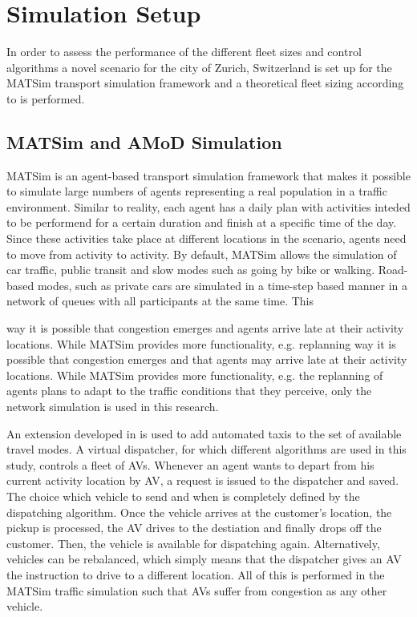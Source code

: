 \section{Simulation Setup}

In order to assess the performance of the different fleet sizes and control
algorithms a novel scenario for the city of Zurich, Switzerland is set up
for the MATSim transport simulation framework and a theoretical fleet sizing
according to \citep{spieser2014toward} is performed.


\subsection{MATSim and AMoD Simulation}

MATSim \citep{Horni2015} is an agent-based transport simulation framework that makes it possible
to simulate large numbers of agents representing a real population in a traffic environment. Similar to reality, each agent has a daily plan with activities
inteded to be performend for a certain duration and finish at a specific time of
the day. Since these activities take place at different locations in the scenario,
agents need to move from activity to activity. By default, MATSim allows the
simulation of car traffic, public transit and slow modes such as going by bike
or walking. Road-based modes, such as private cars are simulated in a time-step
based manner in a network of queues with all participants at the same time. This

way it is possible that congestion emerges and agents arrive late at their
activity locations. While MATSim provides more functionality, e.g. replanning
way it is possible that congestion emerges and that agents may arrive late at their
activity locations. While MATSim provides more functionality, e.g. the replanning
of agents plans to adapt to the traffic conditions that they perceive, only the
network simulation is used in this research.

An extension developed in \cite{horl_abmtrans17} is used to add automated taxis to the set
of available travel modes. A virtual dispatcher, for which
different algorithms are used in this study, controls a fleet of AVs.
Whenever an agent wants to depart from his current activity location by
AV, a request is issued to the dispatcher and saved.  The choice which vehicle to send and when is completely defined
by the dispatching algorithm. Once the vehicle arrives at the customer's location,
the pickup is processed, the AV drives to the destiation and finally drops off the customer. Then,
the vehicle is available for dispatching again. Alternatively, vehicles can be
rebalanced, which simply means that the dispatcher gives an AV the instruction
to drive to a different location. All of this is performed in the MATSim traffic
simulation such that AVs suffer from congestion as any other vehicle.

